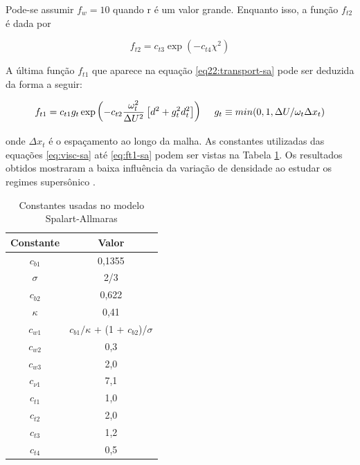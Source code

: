 Pode-se assumir $f_w = 10$ quando r é um valor grande. Enquanto isso, a função $f_{t2}$ é dada por

\begin{equation}
    f_{t2} = c_{t3}\exp{(-c_{t4}\chi^2)}
\end{equation}

A última função $f_{t1}$ que aparece na equação \ref{eq22:transport-sa} pode ser deduzida da forma a seguir:

\begin{equation}
    \label{eq:ft1-sa}
    f_{t1} = c_{t1}g_{t} \exp{\left(-c_{t2}\frac{\omega_{t}^{2}}{\Delta U^2}\left[d^{2} + g_{t}^{2}d_{t}^{2}\right]\right)} \hspace{5mm} g_t \equiv min(0,1, \Delta U/\omega_t \Delta x_t)
\end{equation}

onde $\Delta x_t$ é o espaçamento ao longo da malha. As constantes utilizadas das equações \ref{eq:visc-sa} até \ref{eq:ft1-sa} podem ser vistas na Tabela \ref{tab:tabela-constantes-spalart-allmaras}. Os resultados obtidos mostraram a baixa influência da variação de densidade ao estudar os regimes supersônico \cite{Spalart1992}.

\begin{table}[ht]
\centering
\caption[Constantes usadas no modelo Spalart-Allmaras.]{Constantes usadas no modelo Spalart-Allmaras \cite{Spalart1992}}
\vspace{0.5cm}
\begin{tabular}{c|c}
 
Constante & Valor \\
\hline
$c_{b1}$ & 0,1355 \\
$\sigma$ & 2/3 \\
$c_{b2}$ & 0,622 \\
$\kappa$ & 0,41 \\
$c_{w1}$ & $c_{b1}/\kappa$ + (1 + $c_{b2}$)/$\sigma$ \\
$c_{w2}$ & 0,3 \\
$c_{w3}$ & 2,0 \\
$c_{\nu 1}$ & 7,1 \\
$c_{t1}$ & 1,0 \\
$c_{t2}$ & 2,0 \\
$c_{t3}$ & 1,2 \\
$c_{t4}$ & 0,5 \\

\end{tabular}
\label{tab:tabela-constantes-spalart-allmaras}
\end{table}

